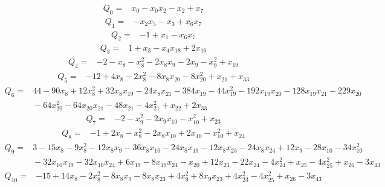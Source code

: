 {\footnotesize
\begin{align*}
 Q_{0}={}&x_{0} -x_{0}x_{2} -x_{2} +x_{7}
\end{align*}
\begin{align*}
 Q_{1}={}&-x_{2}x_{5} -x_{3} +x_{6}x_{7}
\end{align*}
\begin{align*}
 Q_{2}={}&-1 +x_{1} -x_{6}x_{7}
\end{align*}
\begin{align*}
 Q_{3}={}&1 +x_{3} -x_{4}x_{18} +2x_{16}
\end{align*}
\begin{align*}
 Q_{4}={}&-2 -x_{8} -x_{8}^{2} -2x_{8}x_{9} -2x_{9} -x_{9}^{2} +x_{19}
\end{align*}
\begin{align*}
 Q_{5}={}&-12 +4x_{8} -2x_{8}^{2} -8x_{8}x_{20} -8x_{20}^{2} +x_{21} +x_{33}
\end{align*}
\begin{align*}
 Q_{6}={}&44 -90x_{8} +12x_{8}^{2} +32x_{8}x_{19} -24x_{8}x_{21} -384x_{19} -44x_{19}^{2} -192x_{19}x_{20} -128x_{19}x_{21} -229x_{20}\\
 &{}-64x_{20}^{2} -64x_{20}x_{21} -48x_{21} -4x_{21}^{2} +x_{22} +2x_{33}
\end{align*}
\begin{align*}
 Q_{7}={}&-2 -x_{9}^{2} -2x_{9}x_{10} -x_{10}^{2} +x_{23}
\end{align*}
\begin{align*}
 Q_{8}={}&-1 +2x_{8} -x_{8}^{2} -2x_{8}x_{10} +2x_{10} -x_{10}^{2} +x_{24}
\end{align*}
\begin{align*}
 Q_{9}={}&3 -15x_{8} -9x_{8}^{2} -12x_{8}x_{9} -36x_{8}x_{10} -24x_{8}x_{19} -12x_{8}x_{23} -24x_{8}x_{24} +12x_{9} -28x_{10} -34x_{10}^{2}\\
 &{}-32x_{10}x_{19} -32x_{10}x_{24} +6x_{19} -8x_{19}x_{24} -x_{20} +12x_{23} -22x_{24} -4x_{24}^{2} +x_{25} -4x_{25}^{2} +x_{26} -3x_{43}
\end{align*}
\begin{align*}
 Q_{10}={}&-15 +14x_{8} -2x_{8}^{2} -8x_{8}x_{9} -8x_{8}x_{23} +4x_{9}^{2} +8x_{9}x_{23} +4x_{23}^{2} -4x_{25}^{2} +x_{26} -3x_{43}

\end{align*}}
